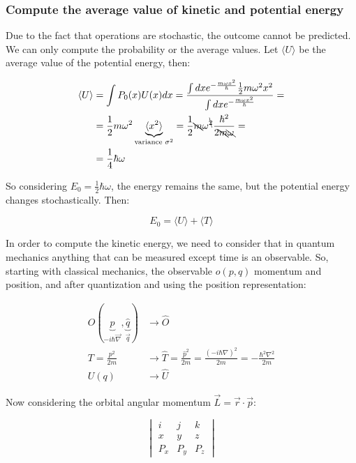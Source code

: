     \subsubsection{Compute the average value of kinetic and potential energy}
    Due to the fact that operations are stochastic, the outcome cannot be predicted. We can only compute the probability or the average values.
    Let $\langle U\rangle $ be the average value of the potential energy, then:

    \begin{align*}
      \langle U\rangle  &= \int P_0(x)U(x)dx = \frac{\int dx e^{-\frac{m\omega x^2}{\hbar}}\frac{1}{2}m\omega^2x^2}{\int dx e^{-\frac{m\omega x^2}{\hbar}}} =\\
          &= \frac{1}{2}m\omega^2\underbrace{\langle x^2\rangle }_{\text{variance }\sigma^2} = \frac{1}{2}\bcancel{m}\omega^{\bcancel{2}}\frac{\hbar^2}{2\bcancel{m}\bcancel{\omega}}=\\
          &=\frac{1}{4}\hbar\omega
    \end{align*}

    So considering $E_0 = \frac{1}{2}\hbar\omega$, the energy remains the same, but the potential energy changes stochastically. Then:

    $$E_0 = \langle U\rangle  + \langle T\rangle $$

    In order to compute the kinetic energy, we need to consider that in quantum mechanics anything that can be measured except time is an observable.
    So, starting with classical mechanics, the observable $o(p,q)$ momentum and position, and after quantization and using the position representation:

    \begin{align*}
      O(\underbrace{\hat{p}}_{-i\hbar\vec{\nabla}},\underbrace{\hat{q}}_{\vec{q}}) &\rightarrow \hat{O}\\
      T = \frac{p^2}{2m}&\rightarrow \hat{T} = \frac{\hat{p}^2}{2m} = \frac{(-i\hbar\nabla)^2}{2m} = -\frac{\hbar^2\nabla^2}{2m}\\
      U(q)&\rightarrow \hat{U}
    \end{align*}

    Now considering the orbital angular momentum $\vec{L} =\vec{r}\cdot\vec{p}$:

    $$\begin{vmatrix}i&j&k\\x&y&z\\P_x&P_y&P_z\end{vmatrix}$$


